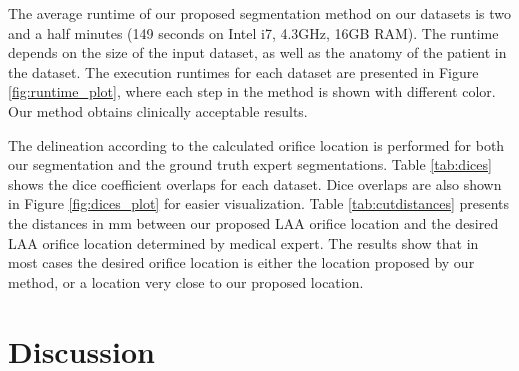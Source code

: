 \documentclass[review]{elsarticle}
\begin{document}
The average runtime of our proposed segmentation method on our datasets is 
  two and a half  minutes (149 seconds 
on Intel i7, 4.3GHz, 16GB RAM).  
The runtime depends on the size of
the input dataset, as well as the anatomy of the patient in the dataset. The
execution runtimes for each dataset are presented in Figure
\ref{fig:runtime_plot}, where each step in the method is shown with different
color. Our method obtains clinically acceptable results.
                    
The delineation according to the calculated orifice location is performed for
both our segmentation and the ground truth expert segmentations. Table
\ref{tab:dices} shows the dice coefficient overlaps for each dataset.  Dice
overlaps are also shown in Figure \ref{fig:dices_plot} for easier
visualization.  Table \ref{tab:cutdistances} presents the distances in mm
between our proposed LAA orifice location and the desired LAA orifice location
determined by medical expert.  The results show that in most cases the desired
orifice location is either the location proposed by our method, or a location
very close to our proposed location. 



\section{Discussion}
\label{sec:discussion}
\end{document}
